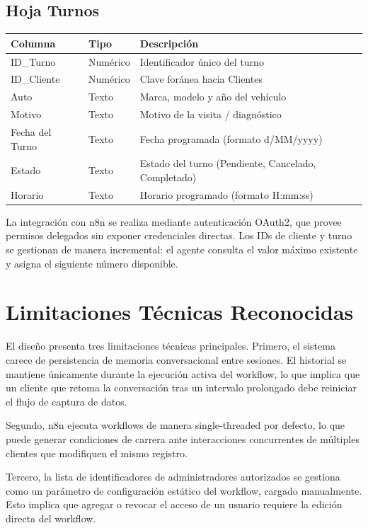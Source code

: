 \documentclass[12pt,a4paper]{report}
\begin{document}
\subsection*{Hoja Turnos}

\begin{tabular}{lll}
\toprule
Columna & Tipo & Descripción \\
\midrule
ID\_Turno & Numérico & Identificador único del turno \\
ID\_Cliente & Numérico & Clave foránea hacia Clientes \\
Auto & Texto & Marca, modelo y año del vehículo \\
Motivo & Texto & Motivo de la visita / diagnóstico \\
Fecha del Turno & Texto & Fecha programada (formato d/MM/yyyy) \\
Estado & Texto & Estado del turno (Pendiente, Cancelado, Completado) \\
Horario & Texto & Horario programado (formato H:mm:ss) \\
\bottomrule
\end{tabular}

La integración con n8n se realiza mediante autenticación OAuth2, que provee permisos delegados sin exponer credenciales directas. Los IDs de cliente y turno se gestionan de manera incremental: el agente consulta el valor máximo existente y asigna el siguiente número disponible.

\section{Limitaciones Técnicas Reconocidas}
\label{sec:limitaciones}

El diseño presenta tres limitaciones técnicas principales. Primero, el sistema carece de persistencia de memoria conversacional entre sesiones. El historial se mantiene únicamente durante la ejecución activa del workflow, lo que implica que un cliente que retoma la conversación tras un intervalo prolongado debe reiniciar el flujo de captura de datos.

Segundo, n8n ejecuta workflows de manera single-threaded por defecto, lo que puede generar condiciones de carrera ante interacciones concurrentes de múltiples clientes que modifiquen el mismo registro.

Tercero, la lista de identificadores de administradores autorizados se gestiona como un parámetro de configuración estático del workflow, cargado manualmente. Esto implica que agregar o revocar el acceso de un usuario requiere la edición directa del workflow.
\end{document}
